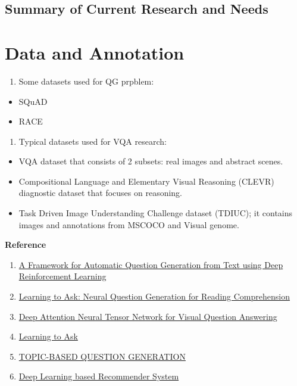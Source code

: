 \documentclass[]{book}
\providecommand{\tightlist}{%
  \setlength{\itemsep}{0pt}\setlength{\parskip}{0pt}}
\theoremstyle{definition}
\theoremstyle{definition}
\theoremstyle{definition}
\theoremstyle{remark}
\begin{document}
\section{Summary of Current Research and
Needs}\label{summary-of-current-research-and-needs}

\chapter{Data and Annotation}\label{data-and-annotation}

\begin{enumerate}
\def\labelenumi{\arabic{enumi}.}
\tightlist
\item
  Some datasets used for QG prpblem:
\end{enumerate}

\begin{itemize}
\item
  SQuAD
\item
  RACE
\end{itemize}

\begin{enumerate}
\def\labelenumi{\arabic{enumi}.}
\setcounter{enumi}{1}
\tightlist
\item
  Typical datasets used for VQA research:
\end{enumerate}

\begin{itemize}
\item
  VQA dataset that consists of 2 subsets: real images and abstract
  scenes.
\item
  Compositional Language and Elementary Visual Reasoning (CLEVR)
  diagnostic dataset that focuses on reasoning.
\item
  Task Driven Image Understanding Challenge dataset (TDIUC); it contains
  images and annotations from MSCOCO and Visual genome.
\end{itemize}

\textbf{Reference}

\begin{enumerate}
\def\labelenumi{\arabic{enumi}.}
\item
  \href{https://arxiv.org/pdf/1808.04961.pdf}{A Framework for Automatic
  Question Generation from Text using Deep Reinforcement Learning}
\item
  \href{https://arxiv.org/pdf/1705.00106.pdf}{Learning to Ask: Neural
  Question Generation for Reading Comprehension}
\item
  \href{http://openaccess.thecvf.com/content_ECCV_2018/papers/Yalong_Bai_Deep_Attention_Neural_ECCV_2018_paper.pdf}{Deep
  Attention Neural Tensor Network for Visual Question Answering}
\item
  \href{http://www.cs.cornell.edu/~xdu/papers/acl17_dsc_poster.pdf}{Learning
  to Ask}
\item
  \href{https://openreview.net/pdf?id=rk3pnae0b}{TOPIC-BASED QUESTION
  GENERATION}
\item
  \href{https://arxiv.org/pdf/1707.07435.pdf}{Deep Learning based
  Recommender System}
\end{enumerate}
\end{document}
